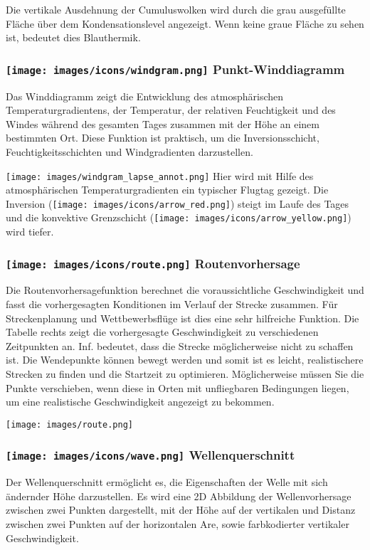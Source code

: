 \documentclass[9pt,a4paper,twocolumn]{article}
\begin{document}
Die vertikale Ausdehnung der Cumuluswolken wird durch die grau ausgefüllte Fläche über dem Kondensationslevel angezeigt. Wenn keine graue Fläche zu sehen ist, bedeutet dies Blauthermik.

\subsubsection*{\texttt{[image: images/icons/windgram.png]} Punkt-Winddiagramm}
Das Winddiagramm zeigt die Entwicklung des atmosphärischen Temperaturgradientens, der Temperatur, der relativen Feuchtigkeit und des Windes während des gesamten Tages zusammen mit der Höhe an einem bestimmten Ort. Diese Funktion ist praktisch, um die Inversionsschicht, Feuchtigkeitsschichten und Windgradienten darzustellen.

\texttt{[image: images/windgram\_lapse\_annot.png]}
Hier wird mit Hilfe des atmosphärischen Temperaturgradienten ein typischer Flugtag gezeigt. Die Inversion (\texttt{[image: images/icons/arrow\_red.png]}) steigt im Laufe des Tages und die konvektive Grenzschicht (\texttt{[image: images/icons/arrow\_yellow.png]}) wird tiefer. 


\subsubsection*{\texttt{[image: images/icons/route.png]} Routenvorhersage}
Die Routenvorhersagefunktion berechnet die voraussichtliche Geschwindigkeit und fasst die vorhergesagten Konditionen im Verlauf der Strecke zusammen. Für Streckenplanung und Wettbewerbsflüge ist dies eine sehr hilfreiche Funktion. Die Tabelle rechts zeigt die vorhergesagte Geschwindigkeit zu verschiedenen Zeitpunkten an. Inf. bedeutet, dass die Strecke möglicherweise nicht zu schaffen ist. Die Wendepunkte können bewegt werden und somit ist es leicht, realistischere Strecken zu finden und die Startzeit zu optimieren. 
Möglicherweise müssen Sie die Punkte verschieben, wenn diese in Orten mit unfliegbaren Bedingungen liegen, um eine realistische Geschwindigkeit angezeigt zu bekommen.


\texttt{[image: images/route.png]}
\subsubsection*{\texttt{[image: images/icons/wave.png]} Wellenquerschnitt}
Der Wellenquerschnitt ermöglicht es, die Eigenschaften der Welle mit sich ändernder Höhe darzustellen. Es wird eine 2D Abbildung der Wellenvorhersage zwischen zwei Punkten dargestellt, mit der Höhe auf der vertikalen und Distanz zwischen zwei Punkten auf der horizontalen Are, sowie farbkodierter vertikaler Geschwindigkeit.
\end{document}
